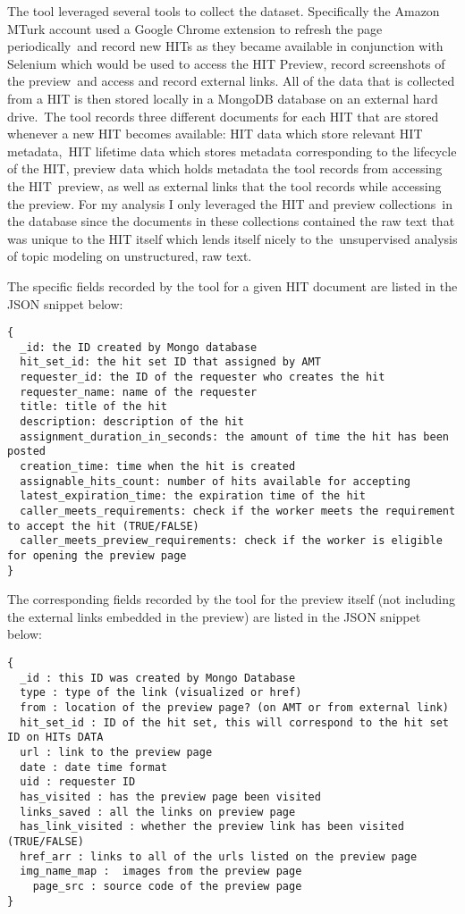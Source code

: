 \documentclass[letterpaper,12pt]{article}
\begin{document}
The tool leveraged several tools to collect the dataset. Specifically the Amazon MTurk account used a Google Chrome extension to refresh the page periodically\
and record new HITs as they became available in conjunction with Selenium which would be used to access the HIT Preview, record screenshots of the preview\
and access and record external links. All of the data that is collected from a HIT is then stored locally in a MongoDB database on an external hard drive.\
The tool records three different documents for each HIT that are stored whenever a new HIT becomes available: HIT data which store relevant HIT metadata,\
HIT lifetime data which stores metadata corresponding to the lifecycle of the HIT, preview data which holds metadata the tool records from accessing the HIT\
preview, as well as external links that the tool records while accessing the preview. For my analysis I only leveraged the HIT and preview collections\
in the database since the documents in these collections contained the raw text that was unique to the HIT itself which lends itself nicely to the\
unsupervised analysis of topic modeling on unstructured, raw text.

The specific fields recorded by the tool for a given HIT document are listed in the JSON snippet below:

\begin{lstlisting}
{	
  _id: the ID created by Mongo database
  hit_set_id: the hit set ID that assigned by AMT
  requester_id: the ID of the requester who creates the hit
  requester_name: name of the requester
  title: title of the hit
  description: description of the hit
  assignment_duration_in_seconds: the amount of time the hit has been posted
  creation_time: time when the hit is created
  assignable_hits_count: number of hits available for accepting
  latest_expiration_time: the expiration time of the hit
  caller_meets_requirements: check if the worker meets the requirement to accept the hit (TRUE/FALSE)
  caller_meets_preview_requirements: check if the worker is eligible for opening the preview page 
}
\end{lstlisting}

The corresponding fields recorded by the tool for the preview itself (not including the external links embedded in the preview) are listed in the JSON snippet below:\

\begin{lstlisting}
{
  _id : this ID was created by Mongo Database
  type : type of the link (visualized or href)
  from : location of the preview page? (on AMT or from external link)
  hit_set_id : ID of the hit set, this will correspond to the hit set ID on HITs DATA
  url : link to the preview page
  date : date time format
  uid : requester ID
  has_visited : has the preview page been visited
  links_saved : all the links on preview page
  has_link_visited : whether the preview link has been visited (TRUE/FALSE)
  href_arr : links to all of the urls listed on the preview page
  img_name_map :  images from the preview page
	page_src : source code of the preview page
}	
\end{lstlisting}
\end{document}
